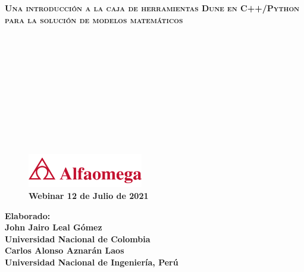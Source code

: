



{
\begin{frame}

	\color{c++reviewduneblue}

	\begin{flushleft}\bfseries\scshape\huge
		Una introducción a la caja de herramientas Dune en
		C++/Python para la solución de modelos matemáticos
	\end{flushleft}

	\

	\

	\

	\

	\

	\

	\begin{minipage}{0.47\textwidth}
		\begin{figure}[ht!]
			\centering
			\includegraphics[height=1.5cm]{alfaomega}
			\caption*{\large\bfseries\textcolor{c++reviewduneblue}{Webinar 12 de Julio de 2021}}
		\end{figure}
	\end{minipage}
	\begin{minipage}{0.5\textwidth}
		\begin{flushright}\large\bfseries
			Elaborado:\\
			John Jairo Leal Gómez\\
			Universidad Nacional de Colombia\\
			Carlos Alonso Aznarán Laos\\
			Universidad Nacional de Ingeniería, Perú
		\end{flushright}
	\end{minipage}
\end{frame}
}

